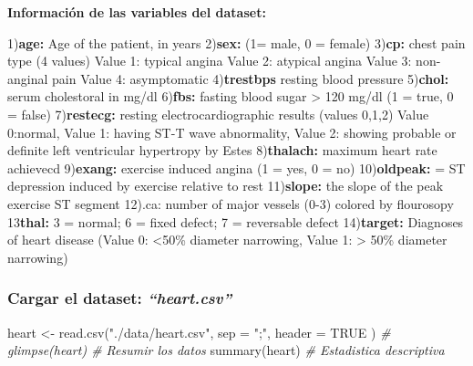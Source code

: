\documentclass[
]{article}
\newenvironment{Shaded}{\begin{snugshade}}{\end{snugshade}}
\newcommand{\AttributeTok}[1]{\textcolor[rgb]{0.77,0.63,0.00}{#1}}
\newcommand{\CommentTok}[1]{\textcolor[rgb]{0.56,0.35,0.01}{\textit{#1}}}
\newcommand{\ConstantTok}[1]{\textcolor[rgb]{0.00,0.00,0.00}{#1}}
\newcommand{\FunctionTok}[1]{\textcolor[rgb]{0.00,0.00,0.00}{#1}}
\newcommand{\NormalTok}[1]{#1}
\newcommand{\OtherTok}[1]{\textcolor[rgb]{0.56,0.35,0.01}{#1}}
\newcommand{\StringTok}[1]{\textcolor[rgb]{0.31,0.60,0.02}{#1}}
\begin{document}
\textbf{Información de las variables del dataset:}

1)\textbf{age:} Age of the patient, in years 2)\textbf{sex:} (1= male, 0
= female) 3)\textbf{cp:} chest pain type (4 values) Value 1: typical
angina Value 2: atypical angina Value 3: non-anginal pain Value 4:
asymptomatic 4)\textbf{trestbps} resting blood pressure 5)\textbf{chol:}
serum cholestoral in mg/dl 6)\textbf{fbs:} fasting blood sugar
\textgreater{} 120 mg/dl (1 = true, 0 = false) 7)\textbf{restecg:}
resting electrocardiographic results (values 0,1,2) Value 0:normal,
Value 1: having ST-T wave abnormality, Value 2: showing probable or
definite left ventricular hypertropy by Estes 8)\textbf{thalach:}
maximum heart rate achievecd 9)\textbf{exang:} exercise induced angina
(1 = yes, 0 = no) 10)\textbf{oldpeak:} = ST depression induced by
exercise relative to rest 11)\textbf{slope:} the slope of the peak
exercise ST segment 12).ca: number of major vessels (0-3) colored by
flourosopy 13\textbf{thal:} 3 = normal; 6 = fixed defect; 7 = reversable
defect 14)\textbf{target:} Diagnoses of heart disease (Value 0:
\textless50\% diameter narrowing, Value 1: \textgreater{} 50\% diameter
narrowing)

\hypertarget{cargar-el-dataset-heart.csv}{%
\subsubsection{\texorpdfstring{Cargar el dataset:
\emph{``heart.csv''}}{Cargar el dataset: ``heart.csv''}}\label{cargar-el-dataset-heart.csv}}

\begin{Shaded}
\begin{Highlighting}[]
\NormalTok{heart }\OtherTok{\textless{}{-}} \FunctionTok{read.csv}\NormalTok{(}\StringTok{"./data/heart.csv"}\NormalTok{, }\AttributeTok{sep =} \StringTok{";"}\NormalTok{, }\AttributeTok{header =} \ConstantTok{TRUE}\NormalTok{ )}
\CommentTok{\# glimpse(heart)   \# Resumir los datos}
\FunctionTok{summary}\NormalTok{(heart)     }\CommentTok{\# Estadistica descriptiva}
\end{Highlighting}
\end{Shaded}
\end{document}
